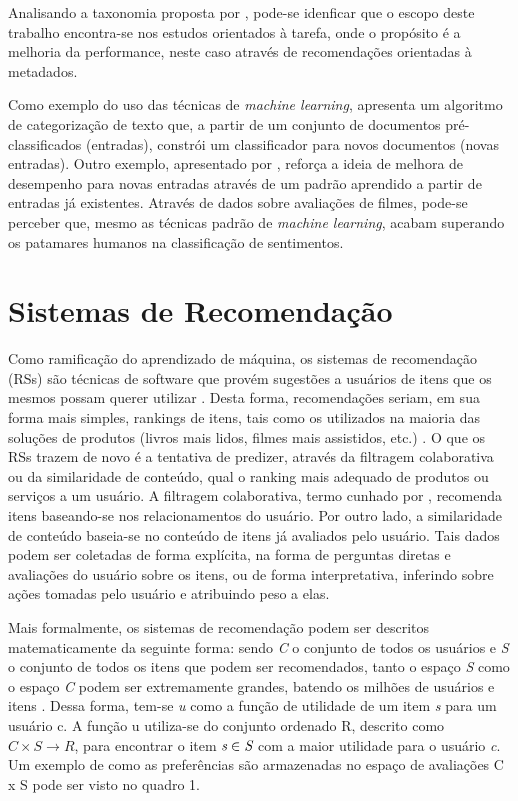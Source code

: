 \documentclass[12pt, openright, oneside, a4paper, brazil]{abntex2}
\begin{document}
Analisando a taxonomia proposta por , pode-se idenficar que o escopo deste trabalho encontra-se nos estudos orientados à tarefa, onde o propósito é a melhoria da performance, neste caso através de recomendações orientadas à metadados.

Como exemplo do uso das técnicas de \textit{machine learning},   apresenta um algoritmo de categorização de texto que, a partir de um conjunto de documentos pré-classificados (entradas), constrói um classificador para novos documentos (novas entradas). Outro exemplo, apresentado por , reforça a ideia de melhora de desempenho para novas entradas através de um padrão aprendido a partir de entradas já existentes. Através de dados sobre avaliações de filmes, pode-se perceber que, mesmo as técnicas padrão de \textit{machine learning}, acabam superando os patamares humanos na classificação de sentimentos.

\section{Sistemas de Recomendação}

Como ramificação do aprendizado de máquina, os sistemas de recomendação (RSs) são técnicas de software que provém sugestões a usuários de itens que os mesmos possam querer utilizar   \cite{resnick1997recommender, schafer1999recommender}. Desta forma, recomendações seriam, em sua forma mais simples, rankings de itens, tais como os utilizados na maioria das soluções de produtos (livros mais lidos, filmes mais assistidos, etc.) \cite{ricci2011introduction}. O que os RSs trazem de novo é a tentativa de predizer, através da filtragem colaborativa ou da similaridade de conteúdo, qual o ranking mais adequado de produtos ou serviços a um usuário. A filtragem colaborativa, termo cunhado por , recomenda itens baseando-se nos relacionamentos do usuário. Por outro lado, a similaridade de conteúdo baseia-se no conteúdo de itens já avaliados pelo usuário. Tais dados podem ser coletadas de forma explícita, na forma de perguntas diretas e avaliações do usuário sobre os itens, ou de forma interpretativa, inferindo sobre ações tomadas pelo usuário e atribuindo peso a elas.

Mais formalmente, os sistemas de recomendação podem ser descritos matematicamente da seguinte forma: sendo \emph{C} o conjunto de todos os usuários e \emph{S} o conjunto de todos os itens que podem ser recomendados, tanto o espaço \emph{S} como o espaço \emph{C} podem ser extremamente grandes, batendo os milhões de usuários e itens \cite{adomavicius2005toward, gomez2016netflix}. Dessa forma, tem-se \textit{u} como a função de utilidade de um item \emph{s} para um usuário c. A função u utiliza-se do conjunto ordenado R, descrito como $C \times S \rightarrow R$, para encontrar o item $\emph{s} \in \emph{S}$ com a maior utilidade para o usuário \emph{c}. Um exemplo de como as preferências são armazenadas no espaço de avaliações C x S pode ser visto no quadro 1.
\end{document}
